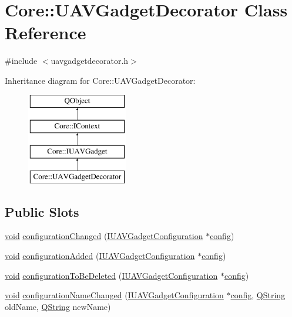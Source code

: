 \hypertarget{class_core_1_1_u_a_v_gadget_decorator}{\section{Core\-:\-:U\-A\-V\-Gadget\-Decorator Class Reference}
\label{class_core_1_1_u_a_v_gadget_decorator}
}


{\ttfamily \#include $<$uavgadgetdecorator.\-h$>$}

Inheritance diagram for Core\-:\-:U\-A\-V\-Gadget\-Decorator\-:\begin{figure}[H]
\begin{center}
\leavevmode
\includegraphics[height=4.000000cm]{class_core_1_1_u_a_v_gadget_decorator}
\end{center}
\end{figure}
\subsection*{Public Slots}
\begin{DoxyCompactItemize}
\item 
\hyperlink{group___u_a_v_objects_plugin_ga444cf2ff3f0ecbe028adce838d373f5c}{void} \hyperlink{group___core_plugin_ga8a003ada3aa27fd0e98e1d91610cd59b}{configuration\-Changed} (\hyperlink{class_core_1_1_i_u_a_v_gadget_configuration}{I\-U\-A\-V\-Gadget\-Configuration} $\ast$\hyperlink{deflate_8c_a4473b5227787415097004fd39f55185e}{config})
\item 
\hyperlink{group___u_a_v_objects_plugin_ga444cf2ff3f0ecbe028adce838d373f5c}{void} \hyperlink{group___core_plugin_ga3fcfe36e1ac689138c02cd3945178da0}{configuration\-Added} (\hyperlink{class_core_1_1_i_u_a_v_gadget_configuration}{I\-U\-A\-V\-Gadget\-Configuration} $\ast$\hyperlink{deflate_8c_a4473b5227787415097004fd39f55185e}{config})
\item 
\hyperlink{group___u_a_v_objects_plugin_ga444cf2ff3f0ecbe028adce838d373f5c}{void} \hyperlink{group___core_plugin_gae75d3e369cd07b1bc2fe50a2a00264d4}{configuration\-To\-Be\-Deleted} (\hyperlink{class_core_1_1_i_u_a_v_gadget_configuration}{I\-U\-A\-V\-Gadget\-Configuration} $\ast$\hyperlink{deflate_8c_a4473b5227787415097004fd39f55185e}{config})
\item 
\hyperlink{group___u_a_v_objects_plugin_ga444cf2ff3f0ecbe028adce838d373f5c}{void} \hyperlink{group___core_plugin_ga5ff52091a4bad5f4e04f09035f7ef9ec}{configuration\-Name\-Changed} (\hyperlink{class_core_1_1_i_u_a_v_gadget_configuration}{I\-U\-A\-V\-Gadget\-Configuration} $\ast$\hyperlink{deflate_8c_a4473b5227787415097004fd39f55185e}{config}, \hyperlink{group___u_a_v_objects_plugin_gab9d252f49c333c94a72f97ce3105a32d}{Q\-String} old\-Name, \hyperlink{group___u_a_v_objects_plugin_gab9d252f49c333c94a72f97ce3105a32d}{Q\-String} new\-Name)
\end{DoxyCompactItemize}
